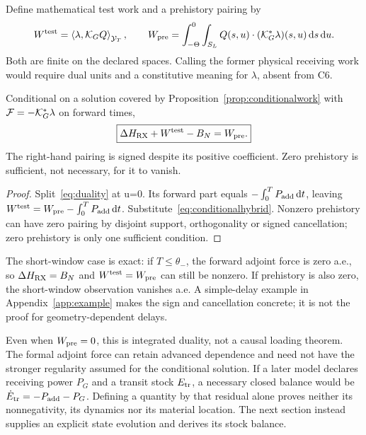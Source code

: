 Define mathematical test work and a prehistory pairing by
\begin{equation}\label{eq:testpre}
W^{\rm test}=\left\langle\lambda,\mathcal K_G Q\right\rangle_{\mathcal Y_T},\qquad
W_{\rm pre}=\int_{-\Theta}^0\int_{S_L}Q(s,u)\cdot(\mathcal K_G^*\lambda)(s,u)\,\mathrm d s\,\mathrm d u.
\end{equation}
Both are finite on the declared spaces. Calling the former physical receiving work would require dual units and a constitutive meaning for $\lambda$, absent from C6.

\begin{corollary}\label{cor:prehistory}
Conditional on a solution covered by Proposition~\ref{prop:conditionalwork} with $\mathcal F=-\mathcal K_G^*\lambda$ on forward times,
\begin{equation}\label{eq:prehistorybalance}
\boxed{\Delta H_{\rm RX}+W^{\rm test}-B_N=W_{\rm pre}.}
\end{equation}
The right-hand pairing is signed despite its positive coefficient. Zero prehistory is sufficient, not necessary, for it to vanish.
\end{corollary}
\begin{proof}
Split~\eqref{eq:duality} at u=0. Its forward part equals $-\int_0^T P_{\rm add}\,\mathrm d t$, leaving
$W^{\rm test}=W_{\rm pre}-\int_0^T P_{\rm add}\,\mathrm d t$.
Substitute~\eqref{eq:conditionalhybrid}. Nonzero prehistory can have zero pairing by disjoint support, orthogonality or signed cancellation; zero prehistory is only one sufficient condition.
\end{proof}

The short-window case is exact: if $T\le\theta_-$, the forward adjoint force is zero a.e., so $\Delta H_{\rm RX}=B_N$ and $W^{\rm test}=W_{\rm pre}$ can still be nonzero. If prehistory is also zero, the short-window observation vanishes a.e. A simple-delay example in Appendix~\ref{app:example} makes the sign and cancellation concrete; it is not the proof for geometry-dependent delays.

Even when $W_{\rm pre}=0$, this is integrated duality, not a causal loading theorem. The formal adjoint force can retain advanced dependence and need not have the stronger regularity assumed for the conditional solution. If a later model declares receiving power $P_G$ and a transit stock $E_{\rm tr}$, a necessary closed balance would be $\dot E_{\rm tr}=-P_{\rm add}-P_G$. Defining a quantity by that residual alone proves neither its nonnegativity, its dynamics nor its material location. The next section instead supplies an explicit state evolution and derives its stock balance.

